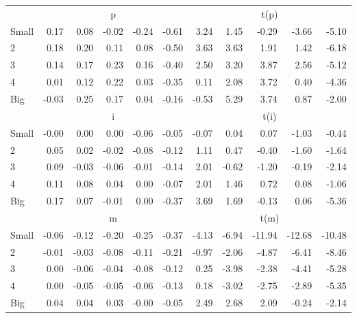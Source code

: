 \begin{table}[!ht]
\begin{tabular}{lrrrrrrrrrr}
      & \multicolumn{5}{c}{p} & \multicolumn{5}{c}{t(p)}
    
    \\
      \cmidrule(r){2-6} \cmidrule(r){7-11}

    Small   & 0.17  & 0.08  & -0.02  & -0.24  & -0.61  & 3.24  & 1.45  & -0.29  & -3.66  & -5.10  \\
         2  & 0.18  & 0.20  & 0.11  & 0.08  & -0.50  & 3.63  & 3.63  & 1.91  & 1.42  & -6.18  \\
         3  & 0.14  & 0.17  & 0.23  & 0.16  & -0.40  & 2.50  & 3.20  & 3.87  & 2.56  & -5.12  \\
         4  & 0.01  & 0.12  & 0.22  & 0.03  & -0.35  & 0.11  & 2.08  & 3.72  & 0.40  & -4.36  \\
    Big     & -0.03  & 0.25  & 0.17  & 0.04  & -0.16  & -0.53  & 5.29  & 3.74  & 0.87  & -2.00  \\

  
    
      & \multicolumn{5}{c}{i} & \multicolumn{5}{c}{t(i)}
    
    \\
      \cmidrule(r){2-6} \cmidrule(r){7-11}

    Small   & -0.00  & 0.00  & 0.00  & -0.06  & -0.05  & -0.07  & 0.04  & 0.07  & -1.03  & -0.44  \\
         2  & 0.05  & 0.02  & -0.02  & -0.08  & -0.12  & 1.11  & 0.47  & -0.40  & -1.60  & -1.64  \\
         3  & 0.09  & -0.03  & -0.06  & -0.01  & -0.14  & 2.01  & -0.62  & -1.20  & -0.19  & -2.14  \\
         4  & 0.11  & 0.08  & 0.04  & 0.00  & -0.07  & 2.01  & 1.46  & 0.72  & 0.08  & -1.06  \\
    Big     & 0.17  & 0.07  & -0.01  & 0.00  & -0.37  & 3.69  & 1.69  & -0.13  & 0.06  & -5.36  \\

  
    
      & \multicolumn{5}{c}{m} & \multicolumn{5}{c}{t(m)}
    
    \\
      \cmidrule(r){2-6} \cmidrule(r){7-11}

    Small   & -0.06  & -0.12  & -0.20  & -0.25  & -0.37  & -4.13  & -6.94  & -11.94  & -12.68  & -10.48  \\
         2  & -0.01  & -0.03  & -0.08  & -0.11  & -0.21  & -0.97  & -2.06  & -4.87  & -6.41  & -8.46  \\
         3  & 0.00  & -0.06  & -0.04  & -0.08  & -0.12  & 0.25  & -3.98  & -2.38  & -4.41  & -5.28  \\
         4  & 0.00  & -0.05  & -0.05  & -0.06  & -0.13  & 0.18  & -3.02  & -2.75  & -2.89  & -5.35  \\
    Big     & 0.04  & 0.04  & 0.03  & -0.00  & -0.05  & 2.49  & 2.68  & 2.09  & -0.24  & -2.14  \\

  

  \bottomrule
\end{tabular}
\label{tbl:25_Size_Var_F17}
\end{table}